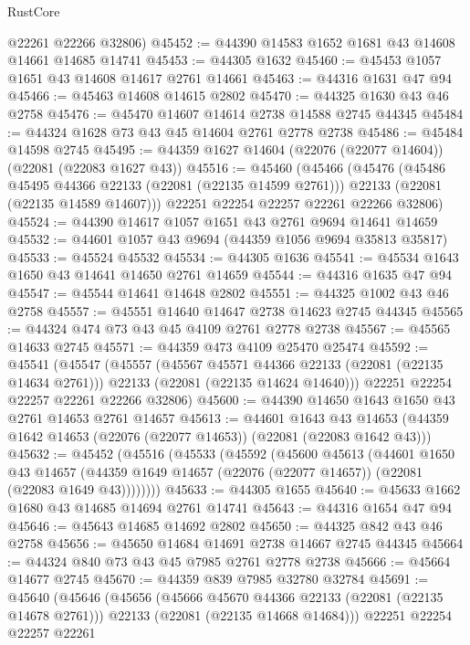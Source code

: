 \begin{lexlean}{RustCore}
\begin{coremodule}
      @22261
      @22266
      @32806)
@45452 := @44390 @14583 @1652 @1681 @43 @14608 @14661 @14685 @14741
@45453 := @44305 @1632
@45460 := @45453 @1057 @1651 @43 @14608 @14617 @2761 @14661
@45463 := @44316 @1631 @47 @94
@45466 := @45463 @14608 @14615 @2802
@45470 := @44325 @1630 @43 @46 @2758
@45476 := @45470 @14607 @14614 @2738 @14588 @2745 @44345
@45484 := @44324 @1628 @73 @43 @45 @14604 @2761 @2778 @2738
@45486 := @45484 @14598 @2745
@45495 := @44359 @1627 @14604 (@22076 (@22077 @14604)) (@22081 (@22083 @1627 @43))
@45516 := @45460
    (@45466
      (@45476
        (@45486 @45495 @44366 @22133 (@22081 (@22135 @14599 @2761)))
        @22133
        (@22081 (@22135 @14589 @14607)))
      @22251
      @22254
      @22257
      @22261
      @22266
      @32806)
@45524 := @44390 @14617 @1057 @1651 @43 @2761 @9694 @14641 @14659
@45532 := @44601 @1057 @43 @9694 (@44359 @1056 @9694 @35813 @35817)
@45533 := @45524 @45532
@45534 := @44305 @1636
@45541 := @45534 @1643 @1650 @43 @14641 @14650 @2761 @14659
@45544 := @44316 @1635 @47 @94
@45547 := @45544 @14641 @14648 @2802
@45551 := @44325 @1002 @43 @46 @2758
@45557 := @45551 @14640 @14647 @2738 @14623 @2745 @44345
@45565 := @44324 @474 @73 @43 @45 @4109 @2761 @2778 @2738
@45567 := @45565 @14633 @2745
@45571 := @44359 @473 @4109 @25470 @25474
@45592 := @45541
    (@45547
      (@45557
        (@45567 @45571 @44366 @22133 (@22081 (@22135 @14634 @2761)))
        @22133
        (@22081 (@22135 @14624 @14640)))
      @22251
      @22254
      @22257
      @22261
      @22266
      @32806)
@45600 := @44390 @14650 @1643 @1650 @43 @2761 @14653 @2761 @14657
@45613 := @44601
    @1643
    @43
    @14653
    (@44359 @1642 @14653 (@22076 (@22077 @14653)) (@22081 (@22083 @1642 @43)))
@45632 := @45452
    (@45516
      (@45533
        (@45592
          (@45600
            @45613
            (@44601
              @1650
              @43
              @14657
              (@44359 @1649 @14657 (@22076 (@22077 @14657)) (@22081 (@22083 @1649 @43))))))))
@45633 := @44305 @1655
@45640 := @45633 @1662 @1680 @43 @14685 @14694 @2761 @14741
@45643 := @44316 @1654 @47 @94
@45646 := @45643 @14685 @14692 @2802
@45650 := @44325 @842 @43 @46 @2758
@45656 := @45650 @14684 @14691 @2738 @14667 @2745 @44345
@45664 := @44324 @840 @73 @43 @45 @7985 @2761 @2778 @2738
@45666 := @45664 @14677 @2745
@45670 := @44359 @839 @7985 @32780 @32784
@45691 := @45640
    (@45646
      (@45656
        (@45666 @45670 @44366 @22133 (@22081 (@22135 @14678 @2761)))
        @22133
        (@22081 (@22135 @14668 @14684)))
      @22251
      @22254
      @22257
      @22261

\end{coremodule}
\end{lexlean}
